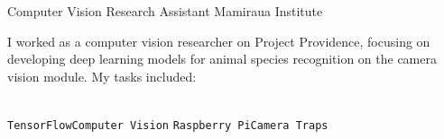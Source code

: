 \documentclass[10pt]{developercv} %
\begin{document}
\begin{entrylist}
  {Computer Vision Research Assistant}
  {Mamiraua Institute}
  {
    I worked as a computer vision researcher on Project Providence, focusing on
developing deep learning models for animal species recognition on the camera
vision module. My tasks included:\\
    \begin{contributionlist}
    \end{contributionlist}\\
\texttt{TensorFlow}\slashsep\texttt{Computer Vision}
\slashsep\texttt {Raspberry Pi}\slashsep\texttt{Camera Traps}}\\\\\\


\end{entrylist}
\end{document}
